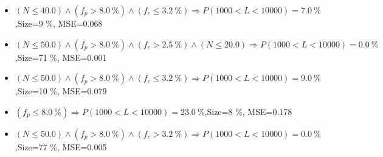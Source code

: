 \documentclass[numbered]{CSL}
\begin{document}
\begin{itemize}
\item $(N \leq 40.0) \land (f_p > 8.0~\%) \land (f_c \leq 3.2~\%) \Rightarrow P(1 000 < L < 10 000) = 7.0~\%$,\hfill Size=9 \%, MSE=0.068
\item $(N \leq 50.0) \land (f_p > 8.0~\%) \land (f_c > 2.5~\%) \land (N \leq 20.0) \Rightarrow P(1 000 < L < 10 000) = 0.0~\%$,\hfill Size=71 \%, MSE=0.001
\item $(N \leq 50.0) \land (f_p > 8.0~\%) \land (f_c \leq 3.2~\%) \Rightarrow P(1 000 < L < 10 000) = 9.0~\%$,\hfill Size=10 \%, MSE=0.079
\item $(f_p \leq 8.0~\%) \Rightarrow P(1 000 < L < 10 000) = 23.0~\%$,\hfill Size=8 \%, MSE=0.178
\item $(N \leq 50.0) \land (f_p > 8.0~\%) \land (f_c > 3.2~\%) \Rightarrow P(1 000 < L < 10 000) = 0.0~\%$,\hfill Size=77 \%, MSE=0.005
\end{itemize}
\end{document}
